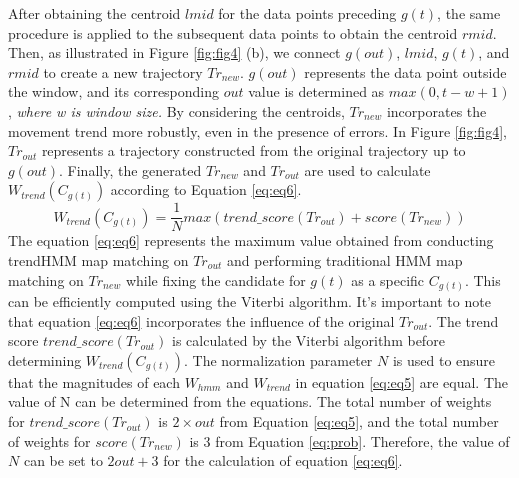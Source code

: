 \documentclass[preprint,12pt]{elsarticle}
\begin{document}
After obtaining the centroid $lmid$ for the data points preceding $g(t)$, the same procedure is applied to the subsequent data points to obtain the centroid $rmid$. Then, as illustrated in Figure \ref{fig:fig4} (b), we connect $g(out)$, $lmid$, $g(t)$, and $rmid$ to create a new trajectory $Tr_{new}$.
$g(out)$ represents the data point outside the window, and its corresponding $out$ value is determined as $max(0, t-w+1)$, \emph{ where w is window size.} By considering the centroids, $Tr_{new}$ incorporates the movement trend more robustly, even in the presence of errors.
In Figure \ref{fig:fig4}, $Tr_{out}$ represents a trajectory constructed from the original trajectory up to $g(out)$.
Finally, the generated $Tr_{new}$ and $Tr_{out}$ are used to calculate $W_{trend}(C_{g(t)})$ according to Equation \ref{eq:eq6}.
\begin{equation} \label{eq:eq6}
	W_{trend}(C_{g(t)})  = \frac{1}{N} max(trend\_score(Tr_{out}) + score(Tr_{new}))
\end{equation}
The equation \ref{eq:eq6} represents the maximum value obtained from conducting trendHMM map matching on $Tr_{out}$ and performing traditional HMM map matching on $Tr_{new}$ while fixing the candidate for $g(t)$ as a specific $C_{g(t)}$. This can be efficiently computed using the Viterbi algorithm.
It's important to note that equation \ref{eq:eq6} incorporates the influence of the original $Tr_{out}$. The trend score $trend\_score(Tr_{out})$ is calculated by the Viterbi algorithm before determining $W_{trend}(C_{g(t)})$.
The normalization parameter $N$ is used to ensure that the magnitudes of each $W_{hmm}$ and $W_{trend}$ in equation \ref{eq:eq5} are equal. 
The value of N can be determined from the equations.
The total number of weights for $trend\_score(Tr_{out})$ is $2\times out$ from Equation \ref{eq:eq5}, and the total number of weights for $score(Tr_{new})$ is $3$ from Equation \ref{eq:prob}. Therefore, the value of $N$ can be set to $2out + 3$ for the calculation of equation \ref{eq:eq6}.
\end{document}
